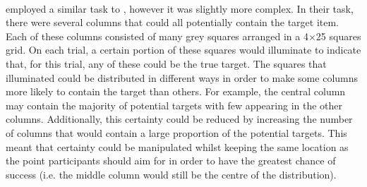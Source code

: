 \documentclass[12pt]{article}
\begin{document}

\paragraph{} \cite{Hudson2007probmove} employed a similar task to \cite{CHAPMAN2010168}, however it was slightly more complex. In their task, there were several columns that could all potentially contain the target item. Each of these columns consisted of many grey squares arranged in a 4$\times$25 squares grid. On each trial, a certain portion of these squares would illuminate to indicate that, for this trial, any of these could be the true target. The squares that illuminated could be distributed in different ways in order to make some columns more likely to contain the target than others. For example, the central column may contain the majority of potential targets with few appearing in the other columns. Additionally, this certainty could be reduced by increasing the number of columns that would contain a large proportion of the potential targets. This meant that certainty could be manipulated whilst keeping the same location as the point participants should aim for in order to have the greatest chance of success (i.e. the middle column would still be the centre of the distribution). 
\end{document}
